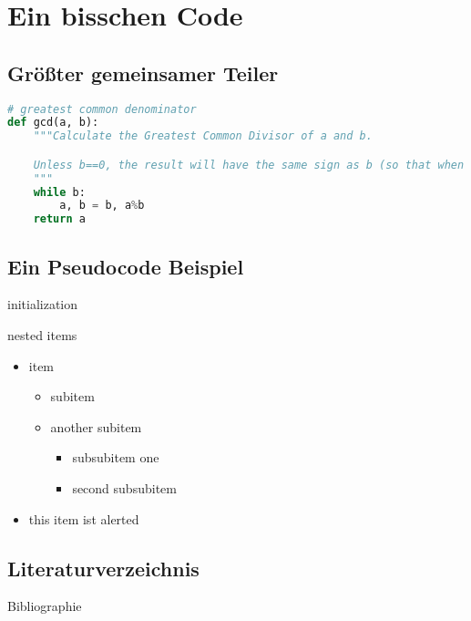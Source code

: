 \section{Ein bisschen Code}
\subsection{Größter gemeinsamer Teiler}
\begin{frame}[fragile]
    \begin{lstlisting}[language=python,caption=GCD in python3]
# greatest common denominator
def gcd(a, b):
    """Calculate the Greatest Common Divisor of a and b.

    Unless b==0, the result will have the same sign as b (so that when b is divided by it, the result comes out positive).
    """
    while b:
        a, b = b, a%b
    return a
    \end{lstlisting}
\end{frame}

\subsection{Ein Pseudocode Beispiel}
\begin{frame}
    \begin{algorithm}[H]
    \SetAlgoLined
    initialization\;
     \caption{How to write algorithms}
    \end{algorithm}
\end{frame}

\begin{frame}{nested items}
    \begin{itemize}
        \item item
        \begin{itemize}
            \item subitem
            \item another subitem
            \begin{itemize}
                \item subsubitem one
                \item second subsubitem
            \end{itemize}
        \end{itemize}
        \item this item ist \alert{alerted}
    \end{itemize}
\end{frame}


\subsection{Literaturverzeichnis}
\begin{frame}[allowframebreaks]{Bibliographie}
    \printbibliography
\end{frame}